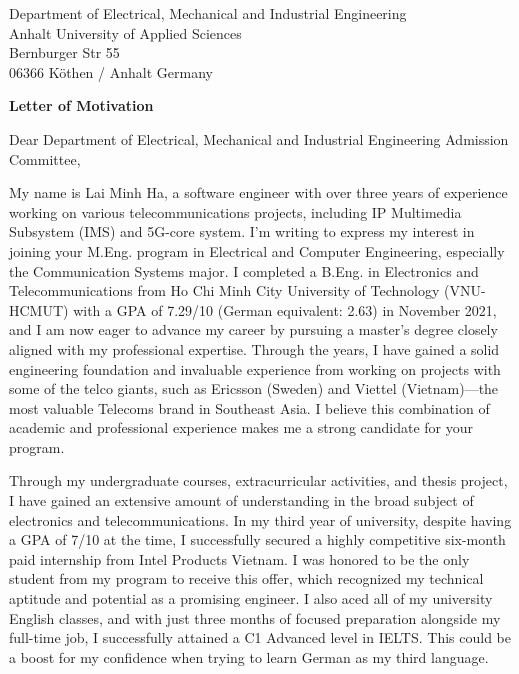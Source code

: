 \documentclass[a4paper,12pt]{letter}
\date{}
\begin{document}
\begin{letter}{
    Department of Electrical, Mechanical and Industrial Engineering
    \\ Anhalt University of Applied Sciences
    \\ Bernburger Str 55 
    \\ 06366 Köthen / Anhalt Germany
}

\vspace*{-1.5cm}
\begin{center}
    \LARGE \textbf{Letter of Motivation}
\end{center}

\vspace{0.2cm} %

\opening{Dear Department of Electrical, Mechanical and Industrial Engineering Admission 
\\Committee,}

My name is Lai Minh Ha, a software engineer with over three years of experience working on various telecommunications projects, including IP Multimedia Subsystem (IMS) and 5G-core system. I'm writing to express my interest in joining your M.Eng. program in Electrical and Computer Engineering, especially the Communication Systems major. I completed a B.Eng. in Electronics and Telecommunications from Ho Chi Minh City University of Technology (VNU-HCMUT) with a GPA of 7.29/10 (German equivalent: 2.63) in November 2021, and I am now eager to advance my career by pursuing a master’s degree closely aligned with my professional expertise. Through the years, I have gained a solid engineering foundation and invaluable experience from working on projects with some of the telco giants, such as Ericsson (Sweden) and Viettel (Vietnam)—the most valuable Telecoms brand in Southeast Asia. I believe this combination of academic and professional experience makes me a strong candidate for your program.

Through my undergraduate courses, extracurricular activities, and thesis project, I have gained an extensive amount of understanding in the broad subject of electronics and telecommunications. In my third year of university, despite having a GPA of 7/10 at the time, I successfully secured a highly competitive six-month paid internship from Intel Products Vietnam. I was honored to be the only student from my program to receive this offer, which recognized my technical aptitude and potential as a promising engineer. I also aced all of my university English classes, and with just three months of focused preparation alongside my full-time job, I successfully attained a C1 Advanced level in IELTS. This could be a boost for my confidence when trying to learn German as my third language.


\end{letter}
\end{document}
